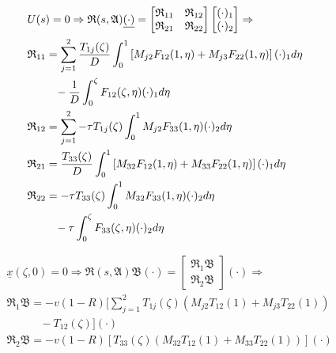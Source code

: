     \begin{equation} \label{eq:resolvent_x}
    \begin{aligned}
        &U(s) = 0 \Rightarrow \mathfrak{R}(s, \mathfrak{A}) \underline{(\cdot)} = \begin{bmatrix}
            \mathfrak{R}_{11} & \mathfrak{R}_{12}\\
            \mathfrak{R}_{21} & \mathfrak{R}_{22}
        \end{bmatrix} \begin{bmatrix}
            (\cdot)_1\\ (\cdot)_2
        \end{bmatrix} \Rightarrow\\
        &\mathfrak{R}_{11} = \sum_{j=1}^2 \frac{T_{1j}(\zeta)}{D} \int_0^1 \left[ M_{j2} F_{12}(1,\eta) + M_{j3} F_{22}(1,\eta) \right] (\cdot)_1 d\eta\\
        &\hspace{2.5em} -\frac{1}{D} \int_0^{\zeta} F_{12}(\zeta, \eta) (\cdot)_1 d\eta\\
        &\mathfrak{R}_{12} = \sum_{j=1}^2 -\tau T_{1j}(\zeta) \int_0^1 M_{j2} F_{33}(1,\eta) (\cdot)_2 d\eta\\
        &\mathfrak{R}_{21} = \frac{T_{33}(\zeta)}{D} \int_0^1 \left[ M_{32} F_{12}(1,\eta) + M_{33} F_{22}(1,\eta) \right] (\cdot)_1 d\eta\\
        &\mathfrak{R}_{22} = -\tau T_{33}(\zeta) \int_0^1 M_{32} F_{33}(1,\eta) (\cdot)_2 d\eta\\
        &\hspace{2.5em} -\tau \int_0^{\zeta} F_{33}(\zeta, \eta) (\cdot)_2 d\eta
    \end{aligned}
    \end{equation}
    
    \begin{equation} \label{eq:resolvent_u}
    \begin{aligned}
        &\underline{x}(\zeta,0) = 0 \Rightarrow \mathfrak{R}(s, \mathfrak{A}) \mathfrak{B} (\cdot) = \begin{bmatrix}
            \mathfrak{R}_{1} \mathfrak{B}\\
            \mathfrak{R}_{2} \mathfrak{B}
        \end{bmatrix} (\cdot) \Rightarrow\\
        &\mathfrak{R}_{1} \mathfrak{B} = -v(1-R) \bigl[ \sum_{j=1}^{2} T_{1j}(\zeta) (M_{j2} T_{12}(1) + M_{j3} T_{22}(1)) \\
        &\hspace{3em} - T_{12}(\zeta) \bigr] (\cdot)\\
        &\mathfrak{R}_{2} \mathfrak{B} = -v(1-R) \left[ T_{33}(\zeta) (M_{32} T_{12}(1) + M_{33} T_{22}(1)) \right] (\cdot)
    \end{aligned}
    \end{equation}

